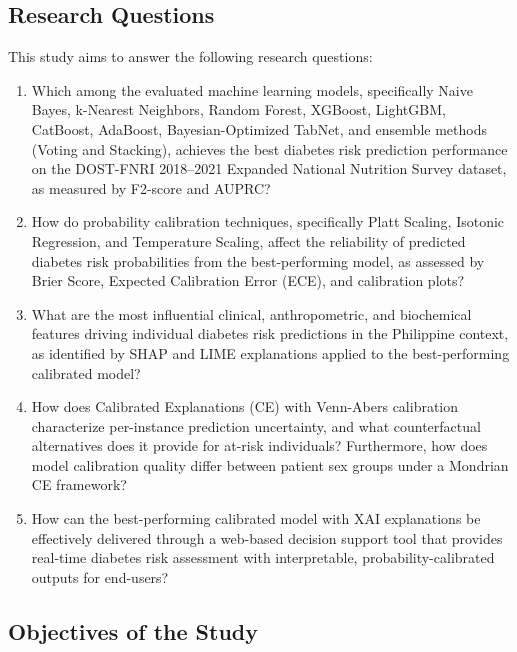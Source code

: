 \subsection{Research Questions}

This study aims to answer the following research questions:

\begin{enumerate}
    \item Which among the evaluated machine learning models, specifically Naive Bayes, k-Nearest Neighbors, Random Forest, XGBoost, LightGBM, CatBoost, AdaBoost, Bayesian-Optimized TabNet, and ensemble methods (Voting and Stacking), achieves the best diabetes risk prediction performance on the DOST-FNRI 2018--2021 Expanded National Nutrition Survey dataset, as measured by F2-score and AUPRC?

    \item How do probability calibration techniques, specifically Platt Scaling, Isotonic Regression, and Temperature Scaling, affect the reliability of predicted diabetes risk probabilities from the best-performing model, as assessed by Brier Score, Expected Calibration Error (ECE), and calibration plots?

    \item What are the most influential clinical, anthropometric, and biochemical features driving individual diabetes risk predictions in the Philippine context, as identified by SHAP and LIME explanations applied to the best-performing calibrated model?

    \item How does Calibrated Explanations (CE) with Venn-Abers calibration characterize per-instance prediction uncertainty, and what counterfactual alternatives does it provide for at-risk individuals? Furthermore, how does model calibration quality differ between patient sex groups under a Mondrian CE framework?

    \item How can the best-performing calibrated model with XAI explanations be effectively delivered through a web-based decision support tool that provides real-time diabetes risk assessment with interpretable, probability-calibrated outputs for end-users?
\end{enumerate}

\subsection{Objectives of the Study}

